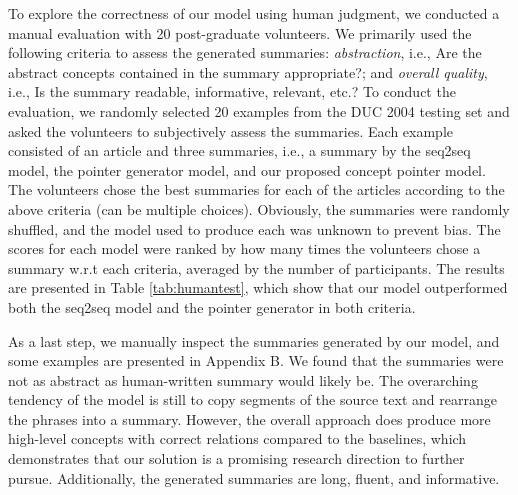 \documentclass[11pt,a4paper]{article}
\begin{document}
\begin{table}[t]
    \centering
    \caption{Human evaluation: scoring of three models in terms of abstraction and overall quality by human evaluators (the higher the better). The score range could be 0-20.  indicates the improvements from the baselines to the concept pointer are statistically significant.}
    \label{tab:humantest}
\end{table}
To explore the correctness of our model using human judgment, we conducted a manual evaluation with 20 post-graduate volunteers. We primarily used the following criteria to assess the generated summaries: {\em abstraction}, i.e., Are the abstract concepts contained in the summary appropriate?; and {\em overall quality}, i.e., Is the summary readable, informative, relevant, etc.? 
To conduct the evaluation, we randomly selected 20 examples from the DUC 2004 testing set and asked the volunteers to subjectively assess the summaries. Each example consisted of an article and three summaries, i.e., a summary by the seq2seq model, the pointer generator model, and our proposed concept pointer model. The volunteers chose the best summaries for each of the articles according to the above criteria (can be multiple choices). Obviously, the summaries were randomly shuffled, and the model used to produce each was unknown to prevent bias. The scores for each model were ranked by how many times the volunteers chose a summary w.r.t each criteria, averaged by the number of participants. The results are presented in Table \ref{tab:humantest}, which show that our model outperformed both the seq2seq model and the pointer generator  \cite{DBLP:conf/acl/SeeLM17} in both criteria. 
 
As a last step, we manually inspect the summaries generated by our model, and some examples are presented in Appendix B. We found that the summaries were not as abstract as human-written summary would likely be. The overarching tendency of the model is still to copy segments of the source text and rearrange the phrases into a summary. However, the overall approach does produce more high-level concepts with correct relations compared to the baselines, which demonstrates that our solution is a promising research direction to further pursue. Additionally, the generated summaries are long, fluent, and informative.
 
\end{document}
